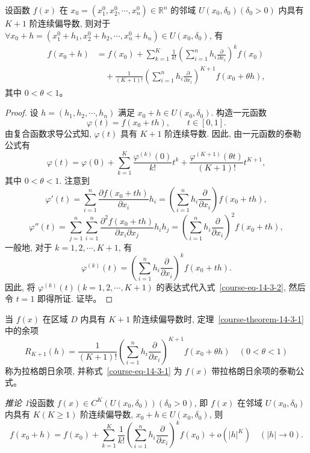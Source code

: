 \documentclass[UTF8,12pt,a4paper,fontset=fandol]{ctexart}
\begin{document}
\begin{theorem}[泰勒公式]\label{course-theorem-14-3-1}\quad 设函数 $f(x)$ 在 $x_0=(x_1^0,x_2^0,\cdots,x_n^0)\in\mathbb R^n$ 的邻域 $U(x_0,\delta_0)(\delta_0>0)$ 内具有 $K+1$ 阶连续偏导数, 则对于 $\forall x_0+h=(x_1^0+h_1,x_2^0+h_2,\cdots,x_n^0+h_n)\in U(x_0,\delta_0)$, 有
\begin{equation}
\begin{aligned}
  f(x_0+h)
  &=f(x_0)+\sum_{k=1}^K\frac1{k!}
  \left(\sum_{i=1}^n h_i\frac{\partial}{\partial x_i}\right)^k f(x_0)\\
  &\quad+\frac1{(K+1)!}
  \left(\sum_{i=1}^n h_i\frac{\partial}{\partial x_i}\right)^{K+1}
  f(x_0+\theta h),
\end{aligned}
\label{course-eq-14-3-1}
\end{equation}
其中 $0<\theta<1$。

\end{theorem}
\begin{proof}\quad 设 $h=(h_1,h_2,\cdots,h_n)$ 满足 $x_0+h\in U(x_0,\delta_0)$. 构造一元函数
\[
  \varphi(t)=f(x_0+th),\qquad t\in[0,1].
\]
由复合函数求导公式知, $\varphi(t)$ 具有 $K+1$ 阶连续导数. 因此, 由一元函数的泰勒公式有
\begin{equation}
  \varphi(t)=\varphi(0)+\sum_{k=1}^K
  \frac{\varphi^{(k)}(0)}{k!}t^k
  +\frac{\varphi^{(K+1)}(\theta t)}{(K+1)!}t^{K+1},
  \label{course-eq-14-3-2}
\end{equation}
其中 $0<\theta<1$. 注意到
\[
  \varphi'(t)=\sum_{i=1}^n\frac{\partial f(x_0+th)}{\partial x_i}h_i
  =\left(\sum_{i=1}^n h_i\frac{\partial}{\partial x_i}\right)f(x_0+th),
\]
\[
  \varphi''(t)=\sum_{j=1}^n\sum_{i=1}^n
  \frac{\partial^2 f(x_0+th)}{\partial x_i\partial x_j}h_ih_j
  =\left(\sum_{i=1}^n h_i\frac{\partial}{\partial x_i}\right)^2 f(x_0+th),
\]
一般地, 对于 $k=1,2,\cdots,K+1$, 有
\[
  \varphi^{(k)}(t)
  =\left(\sum_{i=1}^n h_i\frac{\partial}{\partial x_i}\right)^k f(x_0+th).
\]
因此, 将 $\varphi^{(k)}(t)(k=1,2,\cdots,K+1)$ 的表达式代入式~\eqref{course-eq-14-3-2}, 然后令 $t=1$ 即得所证. 证毕。

\end{proof}
\begin{remark}\quad 当 $f(x)$ 在区域 $D$ 内具有 $K+1$ 阶连续偏导数时, 定理~\ref{course-theorem-14-3-1}  中的余项
\[
  R_{K+1}(h)=\frac1{(K+1)!}
  \left(\sum_{i=1}^n h_i\frac{\partial}{\partial x_i}\right)^{K+1}f(x_0+\theta h)
  \quad(0<\theta<1)
\]
称为拉格朗日余项, 并称式~\eqref{course-eq-14-3-1}  为 $f(x)$ 带拉格朗日余项的泰勒公式。

\end{remark}
\noindent\emph{推论 1}\quad 设函数 $f(x)\in C^K(U(x_0,\delta_0))(\delta_0>0)$, 即 $f(x)$ 在邻域 $U(x_0,\delta_0)$ 内具有 $K(K\geqslant1)$ 阶连续偏导数, $x_0+h\in U(x_0,\delta_0)$, 则
\begin{equation}
  f(x_0+h)=f(x_0)+\sum_{k=1}^K\frac1{k!}
  \left(\sum_{i=1}^n h_i\frac{\partial}{\partial x_i}\right)^k f(x_0)
  +o(|h|^K)
  \quad(|h|\to0).
  \label{course-eq-14-3-3}
\end{equation}
\end{document}
